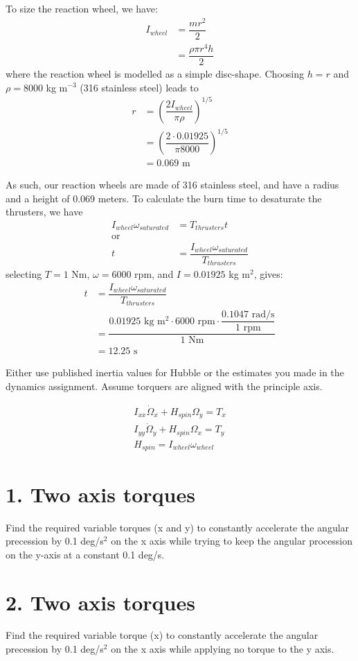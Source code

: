 \documentclass[onecolumn,10pt]{jhwhw}
\begin{document}
To size the reaction wheel, we have:
\begin{align*}
I_{{wheel}} &= \dfrac{m r^2}{2} \\
            &= \dfrac{\rho \pi r^4 h}{2}
\end{align*}
where the reaction wheel is modelled as a simple disc-shape. Choosing $h = r$ and $\rho = 8000$ kg m$^{-3}$ (316 stainless steel) leads to
\begin{align*}
r &= (\dfrac{2 I_{{wheel}}}{\pi \rho})^{1/5} \\
  &= (\dfrac{2 \cdot 0.01925}{\pi 8000})^{1/5} \\
  &= 0.069 \mbox { m}
\end{align*}

As such, our reaction wheels are made of 316 stainless steel, and have a radius and a height of 0.069 meters. To calculate the burn time to desaturate the thrusters, we have
\begin{align*}
I_{{wheel}} \omega_{{saturated}} & = T_{{thrusters}} t \\
\mbox{or} \\
t &= \dfrac{I_{{wheel}} \omega_{{saturated}}}{ T_{{thrusters}} }
\end{align*}
selecting $T =1$ Nm, $\omega=6000$ rpm, and $I=0.01925$ kg m$^2$, gives:
\begin{align*}
t &= \dfrac{I_{{wheel}} \omega_{{saturated}}}{ T_{{thrusters}} } \\
  &= \dfrac{0.01925 \mbox{ kg m$^2$} \cdot 6000\mbox{ rpm} \cdot \dfrac{0.1047\mbox{ rad/s}}{1\mbox{ rpm}}}{1 \mbox{ Nm}} \\
  &= 12.25 \mbox{ s}
\end{align*}

Either use published inertia values for Hubble or the estimates you made in the dynamics assignment. Assume torquers are aligned with the principle axis.

\begin{align*}
I_{xx}\dot{\Omega}_{x} + H_{spin}\Omega_y = T_x \\
I_{yy}\dot{\Omega}_{y} + H_{spin}\Omega_x = T_y \\
H_{spin} = I_{wheel} \omega_{wheel}
\end{align*}

\part{1. Two axis torques}
Find the required variable torques (x and y) to constantly accelerate the angular precession by 0.1 deg/s$^2$ on the x axis while trying to keep the angular procession on the y-axis at a constant 0.1 deg/s.

\part{2. Two axis torques}
Find the required variable torque (x) to constantly accelerate the angular precession by 0.1 deg/s$^2$ on the x axis while applying no torque to the y axis.
\end{document}
